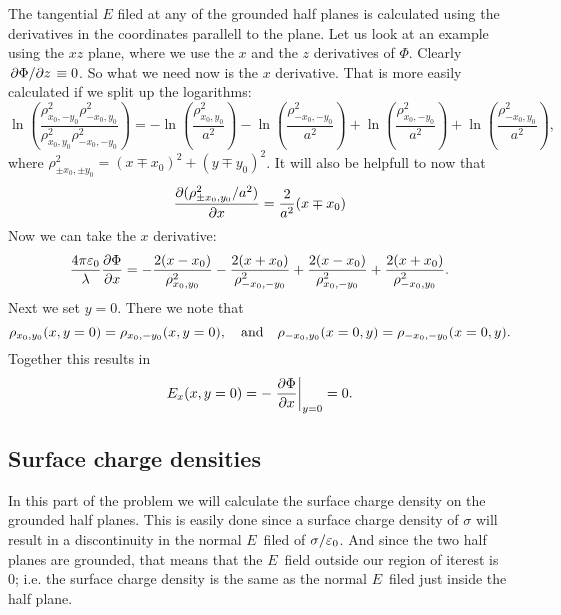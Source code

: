 \documentclass[11pt,letter, swedish, english
]{article}
\newcommand{\enaught}{\ensuremath\varepsilon_0}
\begin{document}
The tangential $E$ filed at any of the grounded half planes is
calculated using the derivatives in the coordinates parallell to the
plane. Let us look at an example using the $xz$ plane, where we use the $x$
and the $z$ derivatives of $\Phi$. Clearly $\pdv*{\Phi}{z}\equiv0$. So
what we need now is the $x$ derivative. That is more easily calculated
if we split up the logarithms:
\begin{equation}\label{eq:5_ln}
\ln(\frac{\rho_{x_0,-y_0}^2\rho_{-x_0,y_0}^2}
{\rho_{x_0,y_0}^2\rho_{-x_0,-y_0}^2})
=-\ln(\frac{\rho_{x_0,y_0}^2}{a^2})-\ln(\frac{\rho_{-x_0,-y_0}^2}{a^2})
+\ln(\frac{\rho_{x_0,-y_0}^2}{a^2})+\ln(\frac{\rho_{-x_0,y_0}^2}{a^2}),
\end{equation}
where $\rho_{\pm x_0,\pm y_0}^2=(x\mp x_0)^2+(y\mp y_0)^2$. It will
also be helpfull to now that
\begin{equation}
\pdv{(\rho_{\pm x_0,y_0}^2/a^2)}{x}=\frac{2}{a^2}(x\mp x_0)
\end{equation}
Now we can take the $x$ derivative:
\begin{equation}\label{eq:5_dPhi/dx}
\frac{4\pi\enaught}{\lambda}\pdv{\Phi}{x}
=-\frac{2(x-x_0)}{\rho_{x_0,y_0}^2}
-\frac{2(x+x_0)}{\rho_{-x_0,-y_0}^2}
+\frac{2(x-x_0)}{\rho_{x_0,-y_0}^2}
+\frac{2(x+x_0)}{\rho_{-x_0,y_0}^2}.
\end{equation}
Next we set $y=0$. There we note that
\begin{equation}
\rho_{x_0,y_0}(x, y=0)=\rho_{x_0,-y_0}(x, y=0)
\qcomma\text{and}\quad
\rho_{-x_0,y_0}(x=0, y)=\rho_{-x_0,-y_0}(x=0, y).
\end{equation}
Together this results in
\begin{equation}
E_x(x, y=0)=-\eval{\pdv{\Phi}{x}}_{y=0}=0.
\end{equation}

\subsection{Surface charge densities}
In this part of the problem we will calculate the surface charge
density on the grounded half planes. This is easily done since a
surface charge density of $\sigma$ will result in a discontinuity in
the normal $E$~filed of $\sigma/\enaught$. And since the two half
planes are grounded, that means that the $E$~field outside our region
of iterest is 0; i.e. the surface charge density is the same as the
normal $E$~filed just inside the half plane. 
\end{document}
